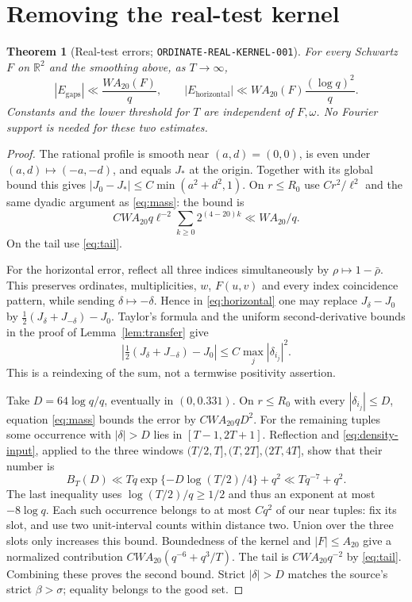 \documentclass[11pt]{article}
\newtheorem{theorem}[lemma]{Theorem}
\newcommand{\R}{\mathbb R}
\newcommand{\Eh}{E_{\mathrm{horizontal}}}
\newcommand{\Eg}{E_{\mathrm{gaps}}}
\begin{document}
\section{Removing the real-test kernel}
\begin{theorem}[Real-test errors; \texttt{ORDINATE-REAL-KERNEL-001}]
\label{thm:real-kernel}
For every Schwartz $F$ on $\R^2$ and the smoothing above, as $T\to\infty$,
\begin{equation}\label{eq:kernel-errors}
 |\Eg|\ll \frac{WA_{20}(F)}q,\qquad
 |\Eh|\ll WA_{20}(F)\frac{(\log q)^2}q.
\end{equation}
Constants and the lower threshold for $T$ are independent of $F,\omega$.
No Fourier support is needed for these two estimates.
\end{theorem}
\begin{proof}
The rational profile is smooth near $(a,d)=(0,0)$, is even under
$(a,d)\mapsto(-a,-d)$, and equals $J_*$ at the origin. Together
with its global bound this gives
$|J_0-J_*|\leq C\min(a^2+d^2,1)$.
On $r\leq R_0$ use $C r^2/\ell^2$ and the same dyadic argument as
\eqref{eq:mass}: the bound is
\[
CWA_{20}q\ell^{-2}\sum_{k\geq0}2^{(4-20)k}\ll WA_{20}/q.
\]
On the tail use \eqref{eq:tail}.

For the horizontal error, reflect all three indices simultaneously by
$\rho\mapsto1-\bar\rho$. This preserves ordinates, multiplicities,
$w$, $F(u,v)$ and every index coincidence pattern, while sending
$\delta\mapsto-\delta$. Hence in \eqref{eq:horizontal} one may
replace $J_\delta-J_0$ by
$\tfrac12(J_\delta+J_{-\delta})-J_0$.
Taylor's formula and the uniform second-derivative bounds in the proof
of Lemma~\ref{lem:transfer} give
\[
 \left|\tfrac12(J_\delta+J_{-\delta})-J_0\right|
 \leq C\max_j|\delta_{i_j}|^2.
\]
This is a reindexing of the sum, not a termwise positivity assertion.

Take $D=64\log q/q$, eventually in $(0,0.331)$.
On $r\leq R_0$ with every $|\delta_{i_j}|\leq D$, equation
\eqref{eq:mass} bounds the error by $CWA_{20}qD^2$.
For the remaining tuples some occurrence with $|\delta|>D$ lies in
$[T-1,2T+1]$. Reflection and \eqref{eq:density-input}, applied to the
three windows $(T/2,T],(T,2T],(2T,4T]$, show that their number is
\[
 B_T(D)\ll Tq\exp\{-D\log(T/2)/4\}+q^2
          \ll Tq^{-7}+q^2.
\]
The last inequality uses $\log(T/2)/q\geq1/2$ and thus an exponent
at most $-8\log q$. Each such occurrence belongs to at most $Cq^2$
of our near tuples: fix its slot, and use two unit-interval counts
within distance two. Union over the three slots only increases this
bound. Boundedness of the kernel and $|F|\leq A_{20}$ give a normalized
contribution $CWA_{20}(q^{-6}+q^3/T)$.
The tail is $CWA_{20}q^{-2}$ by \eqref{eq:tail}.
Combining these proves the second bound. Strict $|\delta|>D$ matches
the source's strict $\beta>\sigma$; equality belongs to the good set.
\end{proof}
\end{document}
